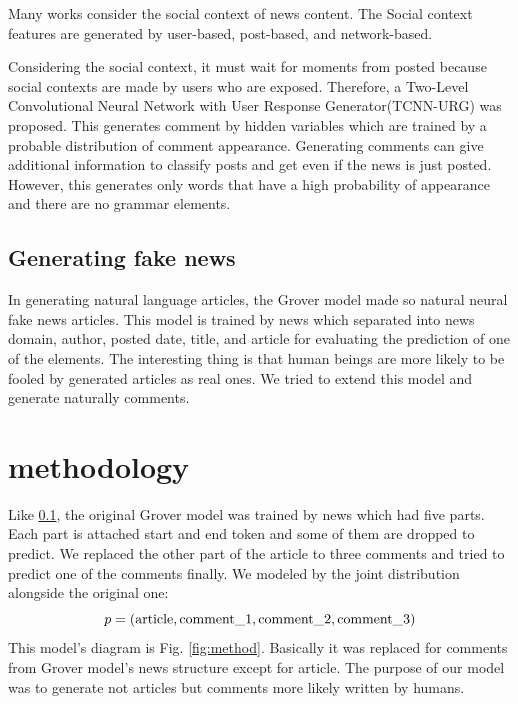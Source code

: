 \documentclass[conference]{IEEEtran}
\begin{document}
Many works consider the social context of news content.
The Social context features are generated by user-based\cite{Castillo:2011:ICT:1963405.1963500,8397048,DBLP:journals/corr/abs-1904-13355}, 
post-based\cite{Yang2019UnsupervisedFN,Tacchini2017SomeLI,Jin:2016:NVE:3016100.3016318},
 and network-based\cite{Wu:2018:TFF:3159652.3159677,DBLP:journals/corr/abs-1902-06673}.

Considering the social context, it must wait for moments from posted because social contexts are made by users who are exposed.
Therefore, a Two-Level Convolutional Neural Network with User Response Generator(TCNN-URG) was proposed\cite{ijcai2018-533}.
This generates comment by hidden variables which are trained by a probable distribution of comment appearance.
Generating comments can give additional information to classify posts and get even if the news is just posted.
However, this generates only words that have a high probability of appearance and there are no grammar elements.

\subsection{Generating fake news}
\label{subsec:generate}
In generating natural language articles, the Grover model made so natural neural fake news articles\cite{NIPS2019_9106}.
This model is trained by news which separated into news domain, author, posted date, title, and article for evaluating the prediction of one of the elements.
The interesting thing is that human beings are more likely to be fooled by generated articles as real ones.
We tried to extend this model and generate naturally comments.
\section{methodology}
Like \ref{subsec:generate}, the original Grover model was trained by news which had five parts.
Each part is attached start and end token and some of them are dropped to predict.
We replaced the other part of the article to three comments and tried to predict one of the comments finally.
We modeled by the joint distribution alongside the original one:
\begin{equation}
    \label{eq:joint_distri}
    p = (\rm{article}, \rm{comment\_1}, \rm{comment\_2}, \rm{comment\_3})
\end{equation}
This model's diagram is Fig. \ref{fig:method}.
Basically it was replaced for comments from Grover model's news structure except for article.
The purpose of our model was to generate not articles but comments more likely written by humans.
\end{document}

